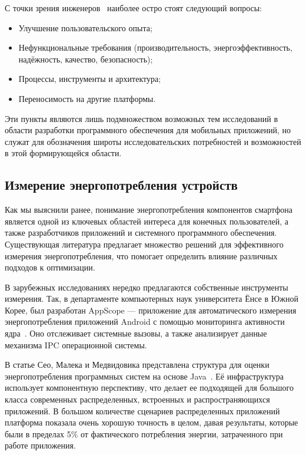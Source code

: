 \documentclass[a4paper,14pt]{extarticle} %
\begin{document}
	С точки зрения инженеров~\parencite{wasserman2010software} наиболее остро стоят следующий вопросы: 
	\begin{itemize}
		\item Улучшение пользовательского опыта; 
		\item Нефункциональные требования (производительность, энергоэффективность, надёжность, качество, безопасность);
		\item Процессы, инструменты и архитектура; 
		\item Переносимость на другие платформы. 
	\end{itemize}

	Эти пункты являются лишь подмножеством возможных тем исследований в области разработки программного обеспечения для мобильных приложений, но служат для обозначения широты исследовательских потребностей и возможностей в этой формирующейся области.
	
	\subsection{Измерение энергопотребления устройств}

	Как мы выяснили ранее, понимание энергопотребления компонентов смартфона является одной из ключевых областей интереса для конечных пользователей, а также разработчиков приложений и системного программного обеспечения. Существующая литература предлагает множество решений для эффективного измерения энергопотребления, что помогает определить влияние различных подходов к оптимизации.
	
	В зарубежных исследованиях нередко предлагаются собственные инструменты измерения. Так, в департаменте компьютерных наук университета Ёнсе в Южной Корее, был разработан AppScope --- приложение для автоматического измерения энергопотребления приложений Android с помощью мониторинга активности ядра~\parencite{yoon2012appscope}. Оно отслеживает системные вызовы, а также анализирует данные механизма IPC операционной системы.
	
	В статье Сео, Малека и Медвидовика представлена структура для оценки энергопотребления программных систем на основе Java~\parencite{seo2007energy}. Её инфраструктура использует компонентную перспективу, что делает ее подходящей для большого класса современных распределенных, встроенных и распространяющихся приложений. В большом количестве сценариев распределенных приложений платформа показала очень хорошую точность в целом, давая результаты, которые были в пределах 5\% от фактического потребления энергии, затраченного при работе приложения.
	
\end{document}
